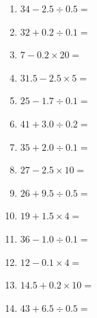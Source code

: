 \documentclass[12pt]{article}
\begin{document}
\begin{enumerate}
\item \large $ 34 - 2.5 \div 0.5 = $ \vspace{1.6cm}
\item \large $ 32 + 0.2 \div 0.1 = $ \vspace{1.6cm}
\item \large $ 7 - 0.2 \times 20 = $ \vspace{1.6cm}
\item \large $ 31.5 - 2.5 \times 5 = $ \vspace{1.6cm}
\newpage
\item \large $ 25 - 1.7 \div 0.1 = $ \vspace{1.6cm}
\item \large $ 41 + 3.0 \div 0.2 = $ \vspace{1.6cm}
\item \large $ 35 + 2.0 \div 0.1 = $ \vspace{1.6cm}
\item \large $ 27 - 2.5 \times 10 = $ \vspace{1.6cm}
\item \large $ 26 + 9.5 \div 0.5 = $ \vspace{1.6cm}
\item \large $ 19 + 1.5 \times 4 = $ \vspace{1.6cm}
\item \large $ 36 - 1.0 \div 0.1 = $ \vspace{1.6cm}
\item \large $ 12 - 0.1 \times 4 = $ \vspace{1.6cm}
\item \large $ 14.5 + 0.2 \times 10 = $ \vspace{1.6cm}
\item \large $ 43 + 6.5 \div 0.5 = $ \vspace{1.6cm}
\end{enumerate}
\newpage
\end{document}
